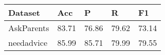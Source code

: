 \begin{tabular}{lllll}
	\toprule
    \textbf{Dataset} & \textbf{Acc} & \textbf{P} & \textbf{R} & \textbf{F1}\\
    \midrule
    AskParents & 83.71 & 76.86 & 79.62 & 73.14 \\
    \midrule
    needadvice & 85.99 & 85.71 & 79.99 & 79.55 \\
    \bottomrule
\end{tabular}

